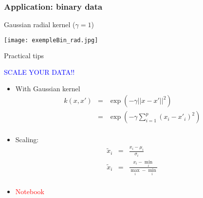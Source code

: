 \begin{frame}
  \frametitle{Application: binary data}
  
  \begin{block}{Gaussian radial kernel ($\gamma=1$)}
    \begin{center}
      \texttt{[image: exempleBin\_rad.jpg]}\\
    \end{center}
  \end{block}
\end{frame}

\begin{frame}{Practical tips}
  \centerline{\textcolor{blue}{SCALE YOUR DATA!!}}

  \begin{itemize}
  \item With Gaussian kernel
    \begin{eqnarray*}
      k(x,x') &=& \exp{\left( - \gamma ||x - x'||^2\right)}\\
              &=& \exp{\left( - \gamma \sum_{i=1}^p(x_i-x'_i)^2\right)}\\
    \end{eqnarray*}
  \item Scaling:
    \begin{eqnarray*}
      \tilde{x}_i &=& \frac{x_i-\mu_i}{\sigma_i}\\
      \tilde{x}_i &=& \frac{x_i-\min_i}{\max_i-\min_i}\\
    \end{eqnarray*}
  \item \textcolor{red}{Notebook}
  \end{itemize}
  
\end{frame}

